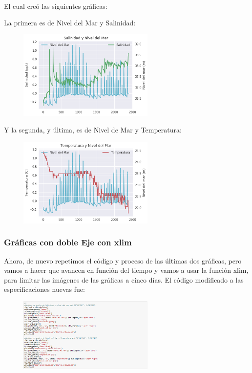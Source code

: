 \documentclass[a4paper]{article}
\begin{document}
El cual creó las siguientes gráficas:

La primera es de Nivel del Mar y Salinidad:
\begin{figure}[ht!]
 \centering
  \includegraphics[width=0.6\textwidth]{Matplotlib4.png}
\end{figure}

\pagebreak
Y la segunda, y última, es de Nivel de Mar y Temperatura:
\begin{figure}[ht!]
 \centering
  \includegraphics[width=0.6\textwidth]{Matplotlib5.png}
\end{figure}

\subsubsection{Gráficas con doble Eje con xlim}
Ahora, de nuevo repetimos el código y proceso de las últimas dos gráficas, pero vamos a hacer que avancen en función del tiempo y vamos a usar la función xlim, para limitar las imágenes de las gráficas a cinco días. El código modificado a las especificaciones nuevas fue:
\begin{figure}[ht!]
 \centering
  \includegraphics[width=0.6\textwidth]{DoblexLimCodigo.PNG}
\end{figure}
\end{document}
